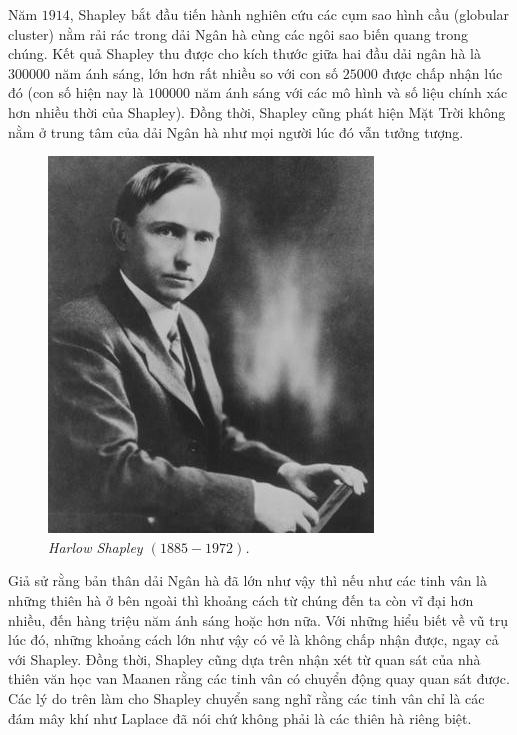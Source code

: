 \begin{multicols}{2}
	\vskip 0.1cm
	Năm $1914$, Shapley bắt đầu tiến hành nghiên cứu các cụm sao hình cầu (globular cluster) nằm rải rác trong dải Ngân hà cùng các ngôi sao biến quang trong chúng. Kết quả Shapley thu được cho kích thước giữa hai đầu dải ngân hà là $300000$ năm ánh sáng, lớn hơn rất nhiều so với con số $25000$ được chấp nhận lúc đó (con số hiện nay là $100 000$ năm ánh sáng với các mô hình và số liệu chính xác hơn nhiều thời của Shapley). Đồng thời, Shapley cũng phát hiện Mặt Trời không nằm ở trung tâm của dải Ngân hà như mọi người lúc đó vẫn tưởng tượng.
	\begin{figure}[H]
		\vspace*{-5pt}
		\centering
		\captionsetup{labelformat= empty, justification=centering}
		\includegraphics[width= 1\linewidth]{8}
		\caption{\small\textit{\color{timhieukhoahoc}Harlow Shapley $(1885 - 1972)$.}}
		\vspace*{-10pt}
	\end{figure}
	Giả sử rằng bản thân dải Ngân hà đã lớn như vậy thì nếu như các tinh vân là những thiên hà ở bên ngoài thì khoảng cách từ chúng đến ta còn vĩ đại hơn nhiều, đến hàng triệu năm ánh sáng hoặc hơn nữa. Với những hiểu biết về vũ trụ lúc đó, những khoảng cách lớn như vậy có vẻ là không chấp nhận được, ngay cả với Shapley. Đồng thời, Shapley cũng dựa trên nhận xét từ quan sát của nhà thiên văn học van Maanen rằng các tinh vân có chuyển động quay quan sát được. Các lý do trên làm cho Shapley chuyển sang nghĩ rằng các tinh vân chỉ là các đám mây khí như Laplace đã nói chứ không phải là các thiên hà riêng biệt.

\end{multicols}
